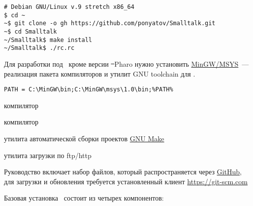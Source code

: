 \clearpage
{}\label{install}

\subsecly{\linux}

\begin{verbatim}
# Debian GNU/Linux v.9 stretch x86_64
$ cd ~
~$ git clone -o gh https://github.com/ponyatov/Smalltalk.git
~$ cd Smalltalk
~/Smalltalk$ make install
~/Smalltalk$ ./rc.rc
\end{verbatim}

\subsecly{\win}

Для разработки под \win\ кроме версии \st\ Pharo нужно установить
\href{http://www.mingw.org/}{MinGW/MSYS}\ --- реализация пакета компиляторов и утилит GNU toolchain
для \win.

\begin{lstlisting}
PATH = C:\MinGW\bin;C:\MinGW\msys\1.0\bin;%PATH%
\end{lstlisting}

\begin{description}[nosep]
    \item{} компилятор \ci
    \item{} компилятор \cpp
    \item{} утилита автоматической сборки проектов \href{http://www.opennet.ru/docs/RUS/gnumake/}{GNU Make}
    \item{} утилита загрузки по ftp/http
    \item{}
\end{description}

\medskip\noindent
Руководство включает набор файлов, который распространяется через \href{https://github.com/ponyatov/Smalltalk}{GitHub},
для загрузки и обновления требуется установленный клиент \url{https://git-scm.com}

\clearpage
{}\label{image}

Базовая установка \ph\ состоит из четырех компонентов:

